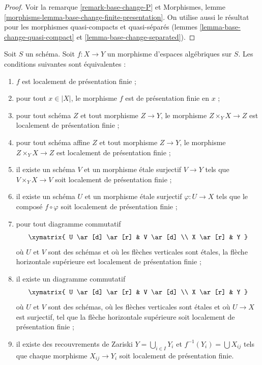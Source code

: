 \begin{proof}
Voir la remarque \ref{remark-base-change-P} et
Morphismes, lemme \ref{morphisms-lemma-base-change-finite-presentation}.
On utilise aussi le résultat pour les morphismes quasi-compacts et quasi-séparés
(lemmes \ref{lemma-base-change-quasi-compact} et
\ref{lemma-base-change-separated}).
\end{proof}

\begin{lemma}
\label{lemma-finite-presentation-local}
Soit $S$ un schéma.
Soit $f : X \to Y$ un morphisme d'espaces algébriques sur $S$.
Les conditions suivantes sont équivalentes :
\begin{enumerate}
\item $f$ est localement de présentation finie ;
\item pour tout $x \in |X|$, le morphisme $f$ est de présentation finie en $x$ ;
\item pour tout schéma $Z$ et tout morphisme $Z \to Y$, le morphisme
$Z \times_Y X \to Z$ est localement de présentation finie ;
\item pour tout schéma affine $Z$ et tout morphisme
$Z \to Y$, le morphisme $Z \times_Y X \to Z$ est localement de présentation finie ;
\item il existe un schéma $V$ et un morphisme étale surjectif
$V \to Y$ tels que $V \times_Y X \to V$ soit
localement de présentation finie ;
\item il existe un schéma $U$ et un morphisme étale surjectif
$\varphi : U \to X$ tels que le composé $f \circ \varphi$
soit localement de présentation finie ;
\item pour tout diagramme commutatif
$$
\xymatrix{
U \ar[d] \ar[r] & V \ar[d] \\
X \ar[r] & Y
}
$$
où $U$ et $V$ sont des schémas et où les flèches verticales sont étales,
la flèche horizontale supérieure est localement de présentation finie ;
\item il existe un diagramme commutatif
$$
\xymatrix{
U \ar[d] \ar[r] & V \ar[d] \\
X \ar[r] & Y
}
$$
où $U$ et $V$ sont des schémas, où les flèches verticales sont étales et où
$U \to X$ est surjectif, tel que la flèche horizontale supérieure soit
localement de présentation finie ;
\item il existe des recouvrements de Zariski $Y = \bigcup_{i \in I} Y_i$
et $f^{-1}(Y_i) = \bigcup X_{ij}$ tels que
chaque morphisme $X_{ij} \to Y_i$ soit localement de présentation finie.
\end{enumerate}
\end{lemma}


